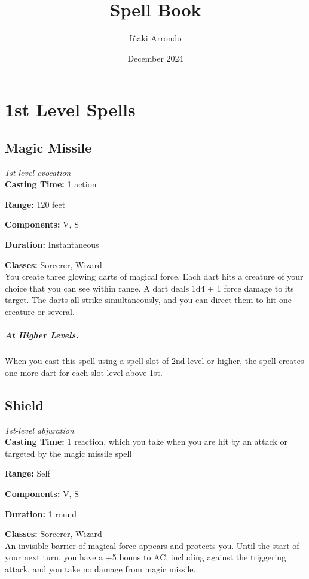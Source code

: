 \documentclass[a6paper,8pt]{book}
\title{Spell Book}
\author{Iñaki Arrondo}
\date{December 2024}
\begin{document}
\maketitle

\chapter{1st Level Spells}

\newpage
\section{Magic Missile}
\noindent\textit{1st-level evocation}\\

\textbf{Casting Time:} 1 action

\textbf{Range:} 120 feet
 
\textbf{Components:} V, S

\textbf{Duration:} Instantaneous 

\textbf{Classes:} Sorcerer, Wizard\\

You create three glowing darts of magical force. Each dart hits a creature of your choice that you can see within range. A dart deals 1d4 + 1 force damage to its target. The darts all strike simultaneously, and you can direct them to hit one creature or several. \\

\paragraph{At Higher Levels.} When you cast this spell using a spell slot of 2nd level or higher, the spell creates one more dart for each slot level above 1st.

\newpage
\section{Shield}
\noindent\textit{1st-level abjuration}\\

\textbf{Casting Time:} 1 reaction, which you take when you are hit by an attack or targeted by the magic missile spell

\textbf{Range:} Self

\textbf{Components:} V, S

\textbf{Duration:} 1 round

\textbf{Classes:} Sorcerer, Wizard\\

An invisible barrier of magical force appears and protects you. Until the start of your next turn, you have a +5 bonus to AC, including against the triggering attack, and you take no damage from magic missile.




\end{document}
